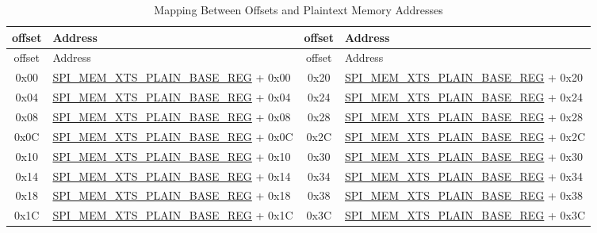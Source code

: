 \begin{longtable}[c]
{ |c|p{5.2cm} |c|p{5.2cm}|}
\caption{Mapping Between Offsets and Plaintext Memory Addresses} 
\label{tab:extmemencr-data-padding}\\
\hline 
\rowcolor{lightgray}
offset &  Address  & offset &  Address \\\hline
\endfirsthead
\hline
\rowcolor{lightgray}
offset &  Address  & offset &  Address   \\\hline
\endhead
\endfoot
0x00 & \hyperref[regdesc:SPIMEMXTSPLAINBASEREG]{SPI\_MEM\_XTS\_PLAIN\_BASE\_REG} + 0x00 & 0x20 & \hyperref[regdesc:SPIMEMXTSPLAINBASEREG]{SPI\_MEM\_XTS\_PLAIN\_BASE\_REG} + 0x20 \\\hline 
0x04 & \hyperref[regdesc:SPIMEMXTSPLAINBASEREG]{SPI\_MEM\_XTS\_PLAIN\_BASE\_REG} + 0x04 & 0x24 & \hyperref[regdesc:SPIMEMXTSPLAINBASEREG]{SPI\_MEM\_XTS\_PLAIN\_BASE\_REG} + 0x24 \\\hline 
0x08 & \hyperref[regdesc:SPIMEMXTSPLAINBASEREG]{SPI\_MEM\_XTS\_PLAIN\_BASE\_REG} + 0x08 & 0x28 & \hyperref[regdesc:SPIMEMXTSPLAINBASEREG]{SPI\_MEM\_XTS\_PLAIN\_BASE\_REG} + 0x28 \\\hline 
0x0C & \hyperref[regdesc:SPIMEMXTSPLAINBASEREG]{SPI\_MEM\_XTS\_PLAIN\_BASE\_REG} + 0x0C & 0x2C & \hyperref[regdesc:SPIMEMXTSPLAINBASEREG]{SPI\_MEM\_XTS\_PLAIN\_BASE\_REG} + 0x2C \\\hline 
0x10 & \hyperref[regdesc:SPIMEMXTSPLAINBASEREG]{SPI\_MEM\_XTS\_PLAIN\_BASE\_REG} + 0x10 & 0x30 & \hyperref[regdesc:SPIMEMXTSPLAINBASEREG]{SPI\_MEM\_XTS\_PLAIN\_BASE\_REG} + 0x30 \\\hline 
0x14 & \hyperref[regdesc:SPIMEMXTSPLAINBASEREG]{SPI\_MEM\_XTS\_PLAIN\_BASE\_REG} + 0x14 & 0x34 & \hyperref[regdesc:SPIMEMXTSPLAINBASEREG]{SPI\_MEM\_XTS\_PLAIN\_BASE\_REG} + 0x34 \\\hline 
0x18 & \hyperref[regdesc:SPIMEMXTSPLAINBASEREG]{SPI\_MEM\_XTS\_PLAIN\_BASE\_REG} + 0x18 & 0x38 & \hyperref[regdesc:SPIMEMXTSPLAINBASEREG]{SPI\_MEM\_XTS\_PLAIN\_BASE\_REG} + 0x38 \\\hline 
0x1C & \hyperref[regdesc:SPIMEMXTSPLAINBASEREG]{SPI\_MEM\_XTS\_PLAIN\_BASE\_REG} + 0x1C & 0x3C & \hyperref[regdesc:SPIMEMXTSPLAINBASEREG]{SPI\_MEM\_XTS\_PLAIN\_BASE\_REG} + 0x3C \\\hline 
\end{longtable}
